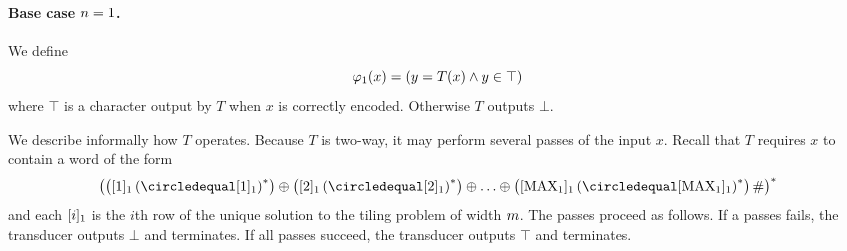 \paragraph{Base case $\expheight = 1$.}

We define
\[
    \goodnums{1}{x} =
        (y = \ap{T}{x} \land y \in \top)
\]
where $\top$ is a character output by $T$ when $x$ is correctly encoded.
Otherwise $T$ outputs $\bot$.

We describe informally how $T$ operates.
Because $T$ is two-way, it may perform several passes of the input $x$.
Recall that $T$ requires $x$ to contain a word of the form
\[
    \brac{
        \brac{\tenc{1}{1} \brac{\numeq \tenc{1}{1}}^\ast}
        \numplus
        \brac{\tenc{1}{2} \brac{\numeq \tenc{1}{2}}^\ast}
        \numplus
        \ldots
        \numplus
        \brac{
            \tenc{1}{\nmax{1}}
                \brac{\numeq \tenc{1}{\nmax{1}}}^\ast
        }
        \numsep
    }^\ast
\]
and each $\tenc{1}{i}$ is the $i$th row of the unique solution to the tiling problem of width $\linlen$.
The passes proceed as follows.
If a passes fails, the transducer outputs $\bot$ and terminates.
If all passes succeed, the transducer outputs $\top$ and terminates.
